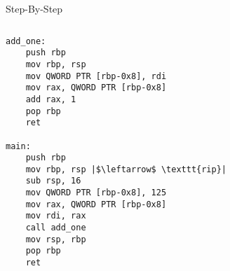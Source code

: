 \documentclass[hyphens,aspectratio=169]{beamer}
\begin{document}
\begin{frame}[fragile]{Step-By-Step}
    \begin{columns}
        \begin{column}{0.33\textwidth}
            \begin{verbatim}
add_one:
    push rbp
    mov rbp, rsp
    mov QWORD PTR [rbp-0x8], rdi
    mov rax, QWORD PTR [rbp-0x8]
    add rax, 1
    pop rbp
    ret

main:
    push rbp
    mov rbp, rsp |$\leftarrow$ \texttt{rip}|
    sub rsp, 16
    mov QWORD PTR [rbp-0x8], 125
    mov rax, QWORD PTR [rbp-0x8]
    mov rdi, rax
    call add_one
    mov rsp, rbp
    pop rbp
    ret
            \end{verbatim}
        \end{column}
        \begin{column}{0.33\textwidth}
\end{column}
\end{columns}
\end{frame}
\end{document}
